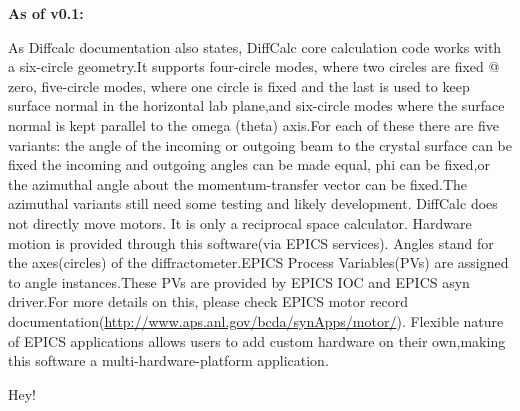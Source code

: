 \documentclass[letterpaper,10pt,english]{sphinxmanual}
\begin{document}
\textbf{As of v0.1:}

As Diffcalc documentation also states, DiffCalc core calculation code works with a six-circle geometry.It supports four-circle modes, where two circles are fixed @ zero, five-circle modes, where one circle is fixed and the last is used to keep surface normal in the horizontal lab plane,and six-circle modes where the surface normal is kept parallel to the omega (theta) axis.For each of these there are five variants: the angle of the incoming or outgoing beam to the crystal surface can be fixed the incoming and outgoing angles can be made equal, phi can be fixed,or the azimuthal angle about the momentum-transfer vector can be fixed.The azimuthal variants still need some testing and likely development.                                       
DiffCalc does not directly move motors. It is only a reciprocal space calculator. Hardware motion is provided through this software(via EPICS services). Angles stand for the axes(circles) of the diffractometer.EPICS Process Variables(PVs) are assigned to angle instances.These PVs are provided by EPICS IOC and EPICS asyn driver.For more details on this, please check EPICS motor record documentation(\href{http://www.aps.anl.gov/bcda/synApps/motor/}{http://www.aps.anl.gov/bcda/synApps/motor/}). Flexible nature of EPICS applications allows users to add custom hardware on their own,making this software a multi-hardware-platform application.

\begin{fulllineitems}
\label{Developer Manual:Diffractometer.Angle}
Hey!

\end{fulllineitems}

\end{document}
